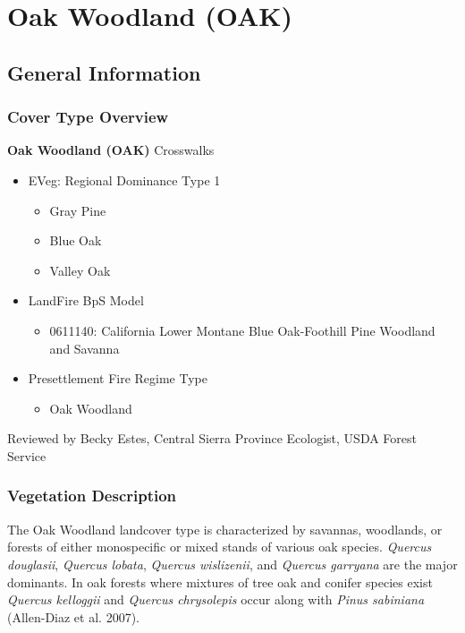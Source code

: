 \newpage
\section{Oak Woodland (OAK)}

\subsection*{General Information}

\subsubsection{Cover Type Overview}

\textbf{Oak Woodland (OAK)} 
\newline
Crosswalks
\begin{itemize}
	\item EVeg: Regional Dominance Type 1
	\begin{itemize}
		\item Gray Pine
		\item Blue Oak
		\item Valley Oak
	\end{itemize}

	\item LandFire BpS Model
	\begin{itemize}
		\item 0611140: California Lower Montane Blue Oak-Foothill Pine Woodland and Savanna
	\end{itemize}

	\item Presettlement Fire Regime Type
	\begin{itemize}
		\item Oak Woodland
	\end{itemize}
\end{itemize}

\noindent Reviewed by Becky Estes, Central Sierra Province Ecologist, USDA Forest Service

\subsubsection{Vegetation Description}
The Oak Woodland landcover type is characterized by savannas, woodlands, or forests of either monospecific or mixed stands of various oak species. \emph{Quercus douglasii}, \emph{Quercus lobata}, \emph{Quercus wislizenii}, and \emph{Quercus garryana} are the major dominants. In oak forests where mixtures of tree oak and conifer species exist \emph{Quercus kelloggii} and \emph{Quercus chrysolepis} occur along with \emph{Pinus sabiniana} (Allen-Diaz et al. 2007). 

